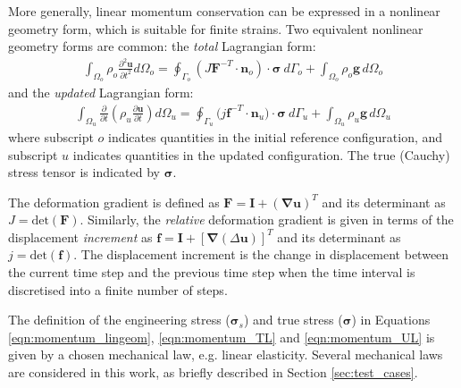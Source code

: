\documentclass[sn-mathphys,Numbered,draft]{sn-jnl}%
\newcommand{\bb}{\boldsymbol}
\begin{document}
More generally,  linear momentum conservation can be expressed in a nonlinear geometry form, which is suitable for finite strains.
Two equivalent nonlinear geometry forms are common: the \emph{total} Lagrangian form:
\begin{eqnarray} \label{eqn:momentum_TL}
    \int_{\Omega_o} \rho_o \frac{\partial^2 \bb{u} }{\partial t^2} d\Omega_o
    =
    \oint_{\Gamma_o} \left( J \bb{F}^{-T} \cdot \bb{n}_o \right) \cdot \bb{\sigma} \ d\Gamma_o
    + \int_{\Omega_o}  \rho_o \bb{g} \, d\Omega_o
\end{eqnarray}
and the \emph{updated} Lagrangian form:
\begin{eqnarray} \label{eqn:momentum_UL}
    \int_{\Omega_u} \frac{\partial }{\partial t} \left( \rho_u \frac{\partial \bb{u} }{\partial t} \right) d\Omega_u
    = \oint_{\Gamma_u}(j\bb{f}^{-T}\cdot{\bb{n}_u)\cdot \bb{\sigma}}\ d\Gamma_u
    + \int_{\Omega_u}  \rho_u \bb{g} \, d\Omega_u
\end{eqnarray}
where subscript $o$ indicates quantities in the initial reference configuration, and subscript $u$ indicates quantities in the updated configuration.
The true (Cauchy) stress tensor is indicated by $\bb{\sigma}$.

The deformation gradient is defined as $\bb{F} = \textbf{I} + (\bb{\nabla} \bb{u})^T$ and its determinant as $J = \text{det}(\bb{F})$.
Similarly, the \emph{relative} deformation gradient is given in terms of the displacement \emph{increment} as $\bb{f}=\textbf{I} + \left[\bb{\nabla}(\Delta \bb{u}) \right]^T$ and its determinant as $j = \text{det}(\bb{f})$.
The displacement increment is the change in displacement between the current time step and the previous time step when the time interval is discretised into a finite number of steps.




The definition of the engineering stress ($\bb{\sigma}_s$) and true stress ($\bb{\sigma}$) in Equations \ref{eqn:momentum_lingeom}, \ref{eqn:momentum_TL} and \ref{eqn:momentum_UL} is given by a chosen mechanical law, e.g. linear elasticity.
Several mechanical laws are considered in this work, as briefly described in Section \ref{sec:test_cases}.
\end{document}
